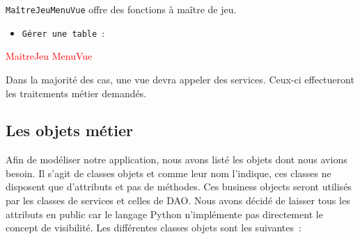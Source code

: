 \documentclass[11pt]{article}
\begin{document}
\texttt{MaîtreJeuMenuVue} offre des fonctions à maître de jeu.
\begin{itemize}[label=, font=\small]
    \item\texttt{Gérer une table}~: 
\end{itemize}
    \textcolor{red}{MaitreJeu MenuVue }

\bigbreak
Dans la majorité des cas, une vue devra appeler des services. Ceux-ci effectueront les traitements métier demandés.


\subsection{Les objets métier}

Afin de modéliser notre application, nous avons listé les objets dont nous avions besoin. Il s’agit de classes objets et comme leur nom l’indique, ces classes ne disposent que d’attributs et pas de méthodes. Ces business objects seront utilisés par les classes de services et celles de DAO. Nous avons décidé de laisser tous les attributs en public car le langage Python n'implémente pas directement le concept de visibilité. Les différentes classes objets sont les suivantes~:

\bigbreak
\end{document}
